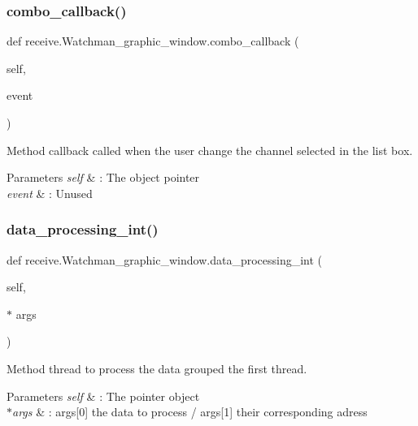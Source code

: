 \subsubsection{\texorpdfstring{combo\_callback()}{combo\_callback()}}
{\footnotesize\ttfamily def receive.\+Watchman\+\_\+graphic\+\_\+window.\+combo\+\_\+callback (\begin{DoxyParamCaption}\item[{}]{self,  }\item[{}]{event }\end{DoxyParamCaption})}



Method callback called when the user change the channel selected in the list box. 


\begin{DoxyParams}{Parameters}
{\em self} & \+: The object pointer \\
\hline
{\em event} & \+: Unused \\
\hline
\end{DoxyParams}
\mbox{\label{classreceive_1_1_watchman__graphic__window_acb7c1aaa438d82608be5913143f2b60c}} 
\subsubsection{\texorpdfstring{data\_processing\_int()}{data\_processing\_int()}\hspace{0.1cm}{\footnotesize\ttfamily [1/2]}}
{\footnotesize\ttfamily def receive.\+Watchman\+\_\+graphic\+\_\+window.\+data\+\_\+processing\+\_\+int (\begin{DoxyParamCaption}\item[{}]{self,  }\item[{$\ast$}]{args }\end{DoxyParamCaption})}



Method thread to process the data grouped the first thread. 


\begin{DoxyParams}{Parameters}
{\em self} & \+: The pointer object \\
\hline
{\em $\ast$args} & \+: args\mbox{[}0\mbox{]} the data to process / args\mbox{[}1\mbox{]} their corresponding adress \\
\hline
\end{DoxyParams}
\mbox{\label{classreceive_1_1_watchman__graphic__window_a1cac17a5de3d4dcb676ba2e6ca93e14a}} 
